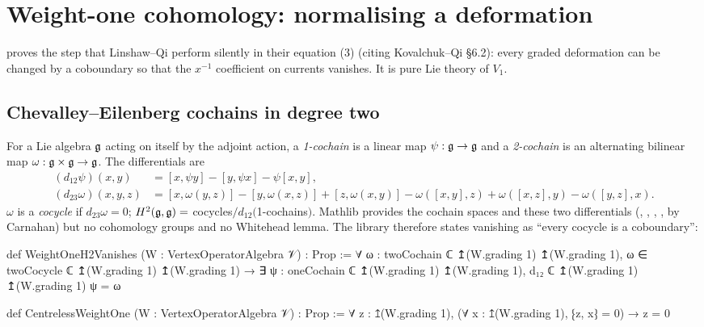 \section{Weight-one cohomology: normalising a deformation}\label{l09:sec:whitehead}

 proves the step that Linshaw--Qi perform silently in
their equation (3) (citing Kovalchuk--Qi \S6.2): every graded deformation can be changed by a
coboundary so that the $x^{-1}$ coefficient on currents vanishes. It is pure Lie theory of $V_1$.

\subsection{Chevalley--Eilenberg cochains in degree two}

For a Lie algebra $\mathfrak{g}$ acting on itself by the adjoint action, a \emph{1-cochain} is a linear
map $\psi:\mathfrak{g}\to\mathfrak{g}$ and a \emph{2-cochain} is an alternating bilinear map
$\omega:\mathfrak{g}\times\mathfrak{g}\to\mathfrak{g}$. The differentials are
\begin{align*}
  (d_{12}\psi)(x,y) &= [x,\psi y] - [y,\psi x] - \psi[x,y],\\
  (d_{23}\omega)(x,y,z) &= [x,\omega(y,z)] - [y,\omega(x,z)] + [z,\omega(x,y)]
     - \omega([x,y],z) + \omega([x,z],y) - \omega([y,z],x).
\end{align*}
$\omega$ is a \emph{cocycle} if $d_{23}\omega = 0$; $H^2(\mathfrak{g},\mathfrak{g}) = $ cocycles$/d_{12}($1-cochains$)$.
Mathlib provides the cochain spaces and these two differentials
(, , , , by Carnahan) but no
cohomology groups and no Whitehead lemma. The library therefore states vanishing as ``every
cocycle is a coboundary'':

\begin{leancode}
def WeightOneH2Vanishes (W : VertexOperatorAlgebra 𝒱) : Prop :=
  ∀ ω : twoCochain ℂ ↥(W.grading 1) ↥(W.grading 1),
    ω ∈ twoCocycle ℂ ↥(W.grading 1) ↥(W.grading 1) →
      ∃ ψ : oneCochain ℂ ↥(W.grading 1) ↥(W.grading 1),
        d₁₂ ℂ ↥(W.grading 1) ↥(W.grading 1) ψ = ω
\end{leancode}
\begin{leancode}
def CentrelessWeightOne (W : VertexOperatorAlgebra 𝒱) : Prop :=
  ∀ z : ↥(W.grading 1), (∀ x : ↥(W.grading 1), ⁅z, x⁆ = 0) → z = 0
\end{leancode}

